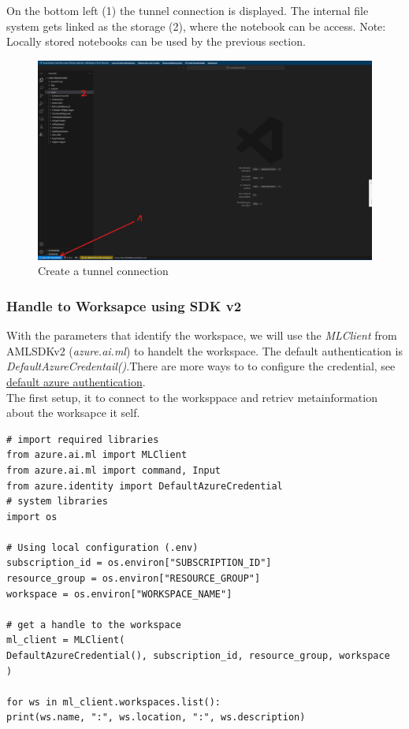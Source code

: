 On the bottom left (1) the tunnel connection is displayed. The internal file system gets linked as the storage (2), where the notebook can be access. Note: Locally stored notebooks can be used by the previous section.

\begin{figure}[H]
	\centering
	\includegraphics[scale = 0.2]{attachment/chapter_AML/Scc021}
	\caption{Create a tunnel connection}
\end{figure}

\subsubsection{Handle to Worksapce using SDK v2}

With the parameters that identify the workspace, we will use the \textit{MLClient} from \gls{AMLSDKv2} (\textit{azure.ai.ml}) to handelt the workspace. The default authentication is \textit{DefaultAzureCredentail()}.There are more ways to to configure the credential, see \href{https://docs.microsoft.com/en-us/python/api/azure-identity/azure.identity.defaultazurecredential?view=azure-python}{default azure authentication}.\\


The first setup, it to connect to the worksppace and retriev metainformation about the worksapce it self.
\begin{lstlisting}[language=iPython]
# import required libraries
from azure.ai.ml import MLClient
from azure.ai.ml import command, Input
from azure.identity import DefaultAzureCredential
# system libraries
import os

# Using local configuration (.env)
subscription_id = os.environ["SUBSCRIPTION_ID"]
resource_group = os.environ["RESOURCE_GROUP"]
workspace = os.environ["WORKSPACE_NAME"]

# get a handle to the workspace
ml_client = MLClient(
DefaultAzureCredential(), subscription_id, resource_group, workspace
)

for ws in ml_client.workspaces.list():
print(ws.name, ":", ws.location, ":", ws.description)
\end{lstlisting}

